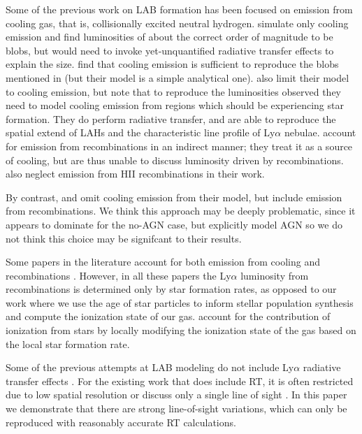 Some of the previous work on LAB formation has been focused on emission from cooling gas, that is, collisionally excited neutral hydrogen.
\citet{Fardal2001} simulate only cooling emission and find luminosities of about the correct order of magnitude to be blobs, but would need to invoke yet-unquantified radiative transfer effects to explain the size.
\citet{Haiman2000} find that cooling emission is sufficient to reproduce the blobs mentioned in \citet{Steidel2000} (but their model is a simple analytical one).
\citet{Faucher-Giguere2010} also limit their model to cooling emission, but note that to reproduce the luminosities observed they need to model cooling emission from regions which should be experiencing star formation.
They do perform radiative transfer, and are able to reproduce the spatial extend of LAHs and the characteristic line profile of Ly$\alpha$ nebulae.
\citet{Rosdahl2012} account for emission from recombinations in an indirect manner; they treat it as a source of cooling, but are thus unable to discuss luminosity driven by recombinations.
\citet{Goerdt2010} also neglect emission from HII recombinations in their work.

By contrast, \citet{Cantalupo2005} and \citet{Gronke2017} omit cooling emission from their model, but include emission from recombinations.
We think this approach may be deeply problematic, since it appears to dominate for the no-AGN case, but \citet{Gronke2017} explicitly model AGN so we do not think this choice may be signifcant to their results.

Some papers in the literature account for both emission from cooling and recombinations \citep{Cen2013, Furlanetto2005, Geach2016, Smailagi2016}.
However, in all these papers the Ly$\alpha$ luminosity from recombinations is determined only by star formation rates, as opposed to our work where we use the age of star particles to inform stellar population synthesis and compute the ionization state of our gas.
\citet{Geach2016} account for the contribution of ionization from stars by locally modifying the ionization state of the gas based on the local star formation rate.

Some of the previous attempts at LAB modeling do not include Ly$\alpha$ radiative transfer effects \citep{Fardal2001, Furlanetto2005, Goerdt2010, Smailagi2016, Rosdahl2012}.
For the existing work that does include RT, it is often restricted due to low spatial resolution \citep{Cen2013} or discuss only a single line of sight \citep{Cantalupo2005}.
In this paper we demonstrate that there are strong line-of-sight variations, which can only be reproduced with reasonably accurate RT calculations.


